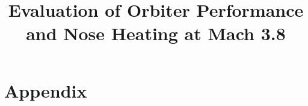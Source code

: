 \documentclass{article}
\title{Evaluation of Orbiter Performance and Nose Heating at Mach 3.8}
\begin{document}
\maketitle








\section*{Appendix}



\end{document}
